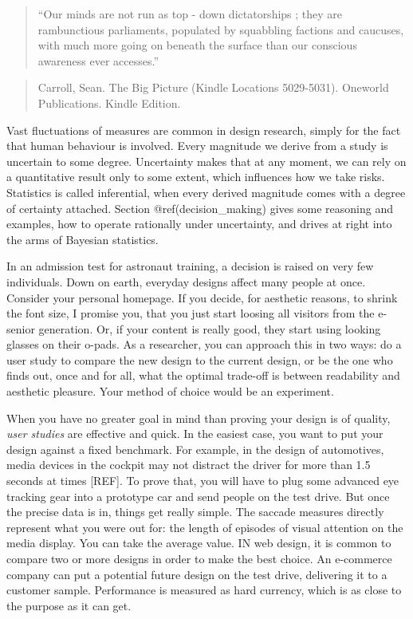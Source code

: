 \documentclass[]{svmono}
\theoremstyle{definition}
\theoremstyle{definition}
\theoremstyle{definition}
\theoremstyle{remark}
\begin{document}
\begin{quote}
``Our minds are not run as top - down dictatorships ; they are
rambunctious parliaments, populated by squabbling factions and caucuses,
with much more going on beneath the surface than our conscious awareness
ever accesses.''
\end{quote}

\begin{quote}
Carroll, Sean. The Big Picture (Kindle Locations 5029-5031). Oneworld
Publications. Kindle Edition.
\end{quote}

Vast fluctuations of measures are common in design research, simply for
the fact that human behaviour is involved. Every magnitude we derive
from a study is uncertain to some degree. Uncertainty makes that at any
moment, we can rely on a quantitative result only to some extent, which
influences how we take risks. Statistics is called inferential, when
every derived magnitude comes with a degree of certainty attached.
Section @ref(decision\_making) gives some reasoning and examples, how to
operate rationally under uncertainty, and drives at right into the arms
of Bayesian statistics.

In an admission test for astronaut training, a decision is raised on
very few individuals. Down on earth, everyday designs affect many people
at once. Consider your personal homepage. If you decide, for aesthetic
reasons, to shrink the font size, I promise you, that you just start
loosing all visitors from the e-senior generation. Or, if your content
is really good, they start using looking glasses on their o-pads. As a
researcher, you can approach this in two ways: do a user study to
compare the new design to the current design, or be the one who finds
out, once and for all, what the optimal trade-off is between readability
and aesthetic pleasure. Your method of choice would be an experiment.

When you have no greater goal in mind than proving your design is of
quality, \emph{user studies} are effective and quick. In the easiest
case, you want to put your design against a fixed benchmark. For
example, in the design of automotives, media devices in the cockpit may
not distract the driver for more than 1.5 seconds at times {[}REF{]}. To
prove that, you will have to plug some advanced eye tracking gear into a
prototype car and send people on the test drive. But once the precise
data is in, things get really simple. The saccade measures directly
represent what you were out for: the length of episodes of visual
attention on the media display. You can take the average value. IN web
design, it is common to compare two or more designs in order to make the
best choice. An e-commerce company can put a potential future design on
the test drive, delivering it to a customer sample. Performance is
measured as hard currency, which is as close to the purpose as it can
get.
\end{document}
